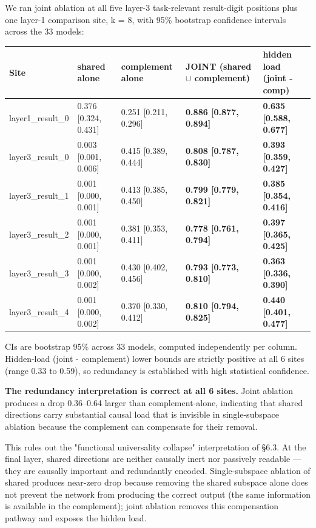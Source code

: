 We ran joint ablation at all five layer-3 task-relevant result-digit
positions plus one layer-1 comparison site, k = 8, with 95\% bootstrap
confidence intervals across the 33 models:

\begin{center}
\begin{tabular}{|l|l|l|l|l|}
\hline
\textbf{Site} & \textbf{shared alone} & \textbf{complement alone} & \textbf{JOINT (shared $\cup$ complement)} & \textbf{hidden load (joint - comp)} \\
\hline
layer1\_result\_0 & 0.376 [0.324, 0.431] & 0.251 [0.211, 0.296] & \textbf{0.886 [0.877, 0.894]} & \textbf{0.635 [0.588, 0.677]} \\
layer3\_result\_0 & 0.003 [0.001, 0.006] & 0.415 [0.389, 0.444] & \textbf{0.808 [0.787, 0.830]} & \textbf{0.393 [0.359, 0.427]} \\
layer3\_result\_1 & 0.001 [0.000, 0.001] & 0.413 [0.385, 0.450] & \textbf{0.799 [0.779, 0.821]} & \textbf{0.385 [0.354, 0.416]} \\
layer3\_result\_2 & 0.001 [0.000, 0.001] & 0.381 [0.353, 0.411] & \textbf{0.778 [0.761, 0.794]} & \textbf{0.397 [0.365, 0.425]} \\
layer3\_result\_3 & 0.001 [0.000, 0.002] & 0.430 [0.402, 0.456] & \textbf{0.793 [0.773, 0.810]} & \textbf{0.363 [0.336, 0.390]} \\
layer3\_result\_4 & 0.001 [0.000, 0.002] & 0.370 [0.330, 0.412] & \textbf{0.810 [0.794, 0.825]} & \textbf{0.440 [0.401, 0.477]} \\
\hline
\end{tabular}
\end{center}


CIs are bootstrap 95\% across 33 models, computed independently per column.
Hidden-load (joint - complement) lower bounds are strictly positive at all
6 sites (range 0.33 to 0.59), so redundancy is established with high
statistical confidence.

\textbf{The redundancy interpretation is correct at all 6 sites.} Joint
ablation produces a drop 0.36--0.64 larger than complement-alone,
indicating that shared directions carry substantial causal load that is
invisible in single-subspace ablation because the complement can
compensate for their removal.

This rules out the "functional universality collapse" interpretation of
\S{}6.3. At the final layer, shared directions are neither causally inert
nor passively readable --- they are causally important and redundantly
encoded. Single-subspace ablation of shared produces near-zero drop
because removing the shared subspace alone does not prevent the network
from producing the correct output (the same information is available in
the complement); joint ablation removes this compensation pathway and
exposes the hidden load.


